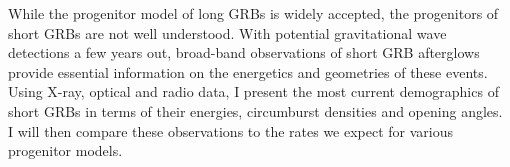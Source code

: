 


\bigskip



\bigskip

\noindent While the progenitor model of long GRBs is widely accepted, the progenitors of short GRBs are not well understood. With potential gravitational wave detections a few years out, broad-band observations of short GRB afterglows provide essential information on the energetics and geometries of these events. Using X-ray, optical and radio data, I present the most current demographics of short GRBs in terms of their energies, circumburst densities and opening angles. I will then compare these observations to the rates we expect for various progenitor models.

